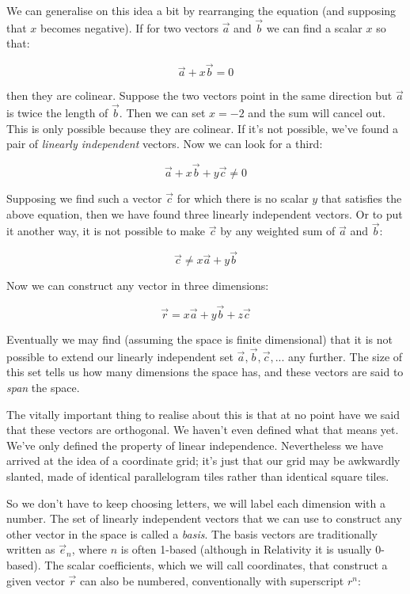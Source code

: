 We can generalise on this idea a bit by rearranging the equation (and supposing that $x$ becomes negative). If for two vectors $\vec{a}$ and $\vec{b}$ we can find a scalar ${x}$ so that:

$$ 
\vec{a} + x \vec{b} = 0
$$

then they are colinear. Suppose the two vectors point in the same direction but $\vec{a}$ is twice the length of $\vec{b}$. Then we can set $x = -2$ and the sum will cancel out. This is only possible because they are colinear. If it's not possible, we've found a pair of \textit{linearly independent} vectors. Now we can look for a third:

$$ 
\vec{a} + x \vec{b} + y \vec{c} \ne 0
$$

Supposing we find such a vector $\vec{c}$ for which there is no scalar $y$ that satisfies the above equation, then we have found three linearly independent vectors. Or to put it another way, it is not possible to make $\vec{c}$ by any weighted sum of $\vec{a}$ and $\vec{b}$:

$$
\vec{c} \ne x \vec{a} + y \vec{b}
$$

Now we can construct any vector in three dimensions:

$$
\vec{r} = x \vec{a} + y \vec{b} + z \vec{c}
$$

Eventually we may find (assuming the space is finite dimensional) that it is not possible to extend our linearly independent set $\vec{a}, \vec{b}, \vec{c}, ...$ any further. The size of this set tells us how many dimensions the space has, and these vectors are said to \textit{span} the space.

The vitally important thing to realise about this is that at no point have we said that these vectors are orthogonal. We haven't even defined what that means yet. We've only defined the property of linear independence. Nevertheless we have arrived at the idea of a coordinate grid; it's just that our grid may be awkwardly slanted, made of identical parallelogram tiles rather than identical square tiles.

So we don't have to keep choosing letters, we will label each dimension with a number. The set of linearly independent vectors that we can use to construct any other vector in the space is called a \textit{basis}. The basis vectors are traditionally written as $\vec{e}_n$, where $n$ is often 1-based (although in Relativity it is usually 0-based). The scalar coefficients, which we will call coordinates, that construct a given vector $\vec{r}$ can also be numbered, conventionally with superscript $r^n$:


